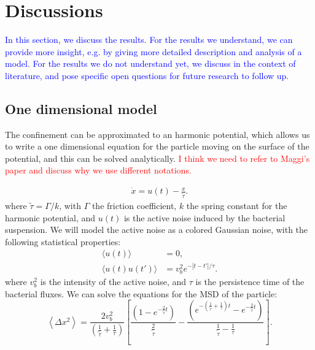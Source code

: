 \documentclass[%
10pt,
superscriptaddress,
twocolumn,
 amsmath,amssymb,
 aps,prx,
]{revtex4-2}
\begin{document}
\section{Discussions}

\textcolor{blue}{
  In this section, we discuss the results. 
  For the results we understand, we can provide more insight, e.g. by giving more detailed description and analysis of a model. 
  For the results we do not understand yet, we discuss in the context of literature, and pose specific open questions for future research to follow up.
}

\subsection{One dimensional model}

The confinement can be approximated to an harmonic potential, which allows us to write a one dimensional equation for the particle moving on the surface of the potential, and this can be solved analytically. \textcolor{red}{I think we need to refer to Maggi's paper and discuss why we use different notations.}

\begin{align}
    \label{eq.Langevin}
    \dot{x}=u(t)-\frac{x}{\tilde{\tau}}.
\end{align}
%
where $\tilde{\tau}=\Gamma/k$, with $\Gamma$ the friction coefficient, $k$ the spring constant for the harmonic potential, and $u(t)$ is the active noise induced by the bacterial suspension.
We will model the active noise as a colored Gaussian noise, with the following statistical properties:
%
\begin{align}
    \label{eq.act.noise}
    \langle u(t)\rangle &=0,\\
    \langle u(t)u(t')\rangle &=v_b^2e^{-|t-t'|/\tau}.
\end{align}
%
where $v_b^2$ is the intensity of the active noise, and $\tau$ is the persistence time of the bacterial fluxes. 
We can solve the equations for the MSD of the particle:
\begin{equation}
	\label{MSD1d}
	\left<\Delta x^2\right>=\frac{2v_b^2}{(\frac{1}{\tilde{\tau}}+\frac{1}{\tau})}\left[\frac{(1-e^{-\frac{2}{\tilde{\tau}} t})}{\frac{2}{\tilde{\tau}}}-\frac{(e^{-(\frac{1}{\tilde{\tau}}+\frac{1}{\tau})t}-e^{-\frac{2}{\tilde{\tau}} t})}{\frac{1}{\tilde{\tau}}-\frac{1}{\tau}}\right].
\end{equation}
\end{document}
